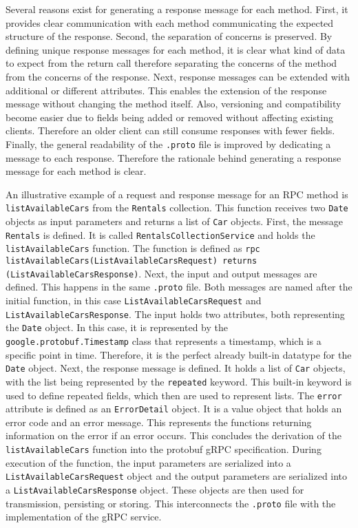 Several reasons exist for generating a response message for each method.
First, it provides clear communication with each method communicating the expected structure of the response.
Second, the separation of concerns is preserved.
By defining unique response messages for each method, it is clear what kind of data to expect from the return call therefore separating the concerns of the method from the concerns of the response.
Next, response messages can be extended with additional or different attributes.
This enables the extension of the response message without changing the method itself.
Also, versioning and compatibility become easier due to fields being added or removed without affecting existing clients.
Therefore an older client can still consume responses with fewer fields.
Finally, the general readability of the \texttt{.proto} file is improved by dedicating a message to each response.
Therefore the rationale behind generating a response message for each method is clear.

An illustrative example of a request and response message for an RPC method is \texttt{listAvailableCars} from the \texttt{Rentals} collection.
This function receives two \texttt{Date} objects as input parameters and returns a list of \texttt{Car} objects.
First, the message \texttt{Rentals} is defined.
It is called \texttt{RentalsCollectionService} and holds the \texttt{listAvailableCars} function.
The function is defined as \texttt{rpc listAvailableCars(ListAvailableCarsRequest) returns (ListAvailableCarsResponse)}.
Next, the input and output messages are defined.
This happens in the same \texttt{.proto} file.
Both messages are named after the initial function, in this case \texttt{ListAvailableCarsRequest} and \texttt{ListAvailableCarsResponse}.
The input holds two attributes, both representing the \texttt{Date} object.
In this case, it is represented by the \texttt{google.protobuf.Timestamp} class that represents a timestamp, which is a specific point in time. 
Therefore, it is the perfect already built-in datatype for the \texttt{Date} object.
Next, the response message is defined.
It holds a list of \texttt{Car} objects, with the list being represented by the \texttt{repeated} keyword.
This built-in keyword is used to define repeated fields, which then are used to represent lists.
The \texttt{error} attribute is defined as an \texttt{ErrorDetail} object.
It is a value object that holds an error code and an error message.
This represents the functions returning information on the error if an error occurs.
This concludes the derivation of the \texttt{listAvailableCars} function into the protobuf gRPC specification.
During execution of the function, the input parameters are serialized into a \texttt{ListAvailableCarsRequest} object and the output parameters are serialized into a \texttt{ListAvailableCarsResponse} object.
These objects are then used for transmission, persisting or storing.
This interconnects the \texttt{.proto} file with the implementation of the gRPC service.

